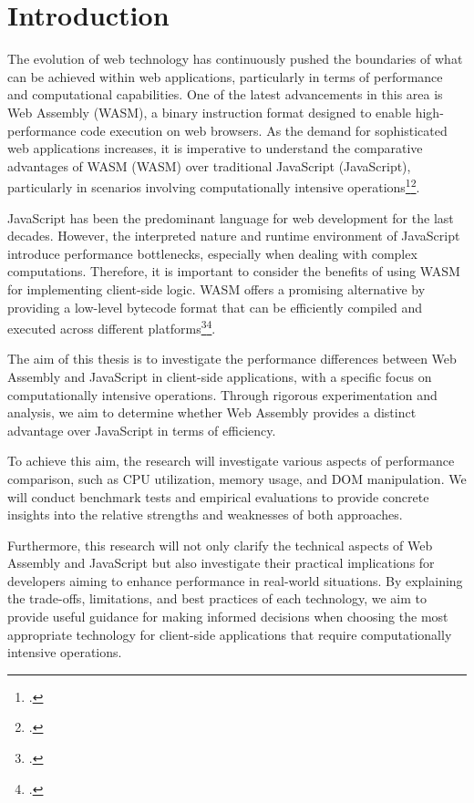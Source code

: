 \newpage

\section{Introduction} \label{introduction}
The evolution of web technology has continuously pushed the boundaries of what can be achieved within web applications, particularly in terms of performance and computational capabilities. One of the latest advancements in this area is Web Assembly (WASM), a binary instruction format designed to enable high-performance code execution on web browsers. As the demand for sophisticated web applications increases, it is imperative to understand the comparative advantages of WASM (WASM) over traditional JavaScript (JavaScript), particularly in scenarios involving computationally intensive operations\footcite{reyes_webassembly_2018}\footcite{mozilla_webassembly_2024}.

JavaScript has been the predominant language for web development for the last decades. However, the interpreted nature and runtime environment of JavaScript introduce performance bottlenecks, especially when dealing with complex computations. Therefore, it is important to consider the benefits of using WASM for implementing client-side logic. WASM offers a promising alternative by providing a low-level bytecode format that can be efficiently compiled and executed across different platforms\footcite{reyes_webassembly_2018}\footcite{mozilla_webassembly_2024}.

The aim of this thesis is to investigate the performance differences between Web Assembly and JavaScript in client-side applications, with a specific focus on computationally intensive operations. Through rigorous experimentation and analysis, we aim to determine whether Web Assembly provides a distinct advantage over JavaScript in terms of efficiency.

To achieve this aim, the research will investigate various aspects of performance comparison, such as CPU utilization, memory usage, and DOM manipulation. We will conduct benchmark tests and empirical evaluations to provide concrete insights into the relative strengths and weaknesses of both approaches.

Furthermore, this research will not only clarify the technical aspects of Web Assembly and JavaScript but also investigate their practical implications for developers aiming to enhance performance in real-world situations. By explaining the trade-offs, limitations, and best practices of each technology, we aim to provide useful guidance for making informed decisions when choosing the most appropriate technology for client-side applications that require computationally intensive operations.

